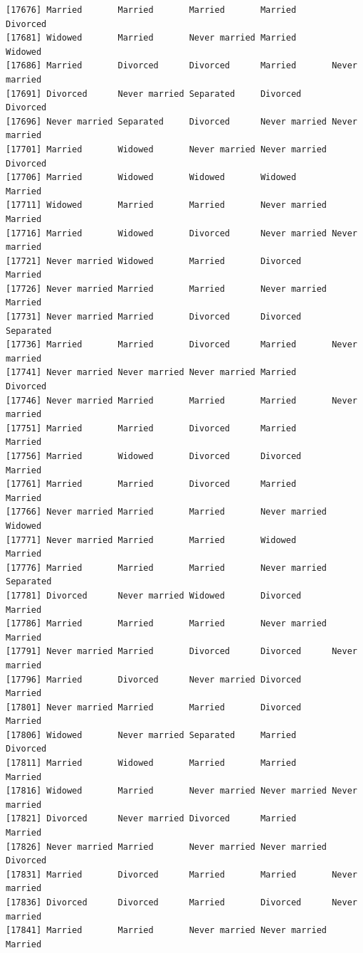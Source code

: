 \documentclass[
  letterpaper,
  DIV=11,
  numbers=noendperiod,
  oneside]{scrartcl}
\begin{document}
\begin{verbatim}
[17676] Married       Married       Married       Married       Divorced     
[17681] Widowed       Married       Never married Married       Widowed      
[17686] Married       Divorced      Divorced      Married       Never married
[17691] Divorced      Never married Separated     Divorced      Divorced     
[17696] Never married Separated     Divorced      Never married Never married
[17701] Married       Widowed       Never married Never married Divorced     
[17706] Married       Widowed       Widowed       Widowed       Married      
[17711] Widowed       Married       Married       Never married Married      
[17716] Married       Widowed       Divorced      Never married Never married
[17721] Never married Widowed       Married       Divorced      Married      
[17726] Never married Married       Married       Never married Married      
[17731] Never married Married       Divorced      Divorced      Separated    
[17736] Married       Married       Divorced      Married       Never married
[17741] Never married Never married Never married Married       Divorced     
[17746] Never married Married       Married       Married       Never married
[17751] Married       Married       Divorced      Married       Married      
[17756] Married       Widowed       Divorced      Divorced      Married      
[17761] Married       Married       Divorced      Married       Married      
[17766] Never married Married       Married       Never married Widowed      
[17771] Never married Married       Married       Widowed       Married      
[17776] Married       Married       Married       Never married Separated    
[17781] Divorced      Never married Widowed       Divorced      Married      
[17786] Married       Married       Married       Never married Married      
[17791] Never married Married       Divorced      Divorced      Never married
[17796] Married       Divorced      Never married Divorced      Married      
[17801] Never married Married       Married       Divorced      Married      
[17806] Widowed       Never married Separated     Married       Divorced     
[17811] Married       Widowed       Married       Married       Married      
[17816] Widowed       Married       Never married Never married Never married
[17821] Divorced      Never married Divorced      Married       Married      
[17826] Never married Married       Never married Never married Divorced     
[17831] Married       Divorced      Married       Married       Never married
[17836] Divorced      Divorced      Married       Divorced      Never married
[17841] Married       Married       Never married Never married Married      

\end{verbatim}
\end{document}
